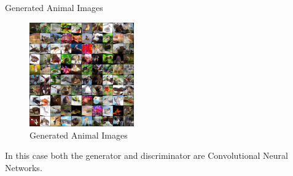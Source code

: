 \begin{frame}{Generated Animal Images}
    \begin{figure}
        \centering
        \includegraphics[width=0.4\textwidth]{../Images/gan8.png}
        \caption{Generated Animal Images}
    \end{figure}
    In this case both the generator and discriminator are Convolutional Neural Networks.
    
\end{frame}

